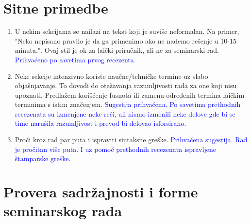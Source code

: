 \documentclass[a4paper]{report}
\newcommand{\odgovor}[1]{\textcolor{blue}{#1}}
\begin{document}
\section{Sitne primedbe}
\begin{enumerate}
\item U nekim sekcijama se nailazi na tekst koji je suviše neformalan. Na primer, "Neko nepisano pravilo je da ga primenimo ako ne nademo rešenje u 10-15 minuta.". Ovaj stil je ok za laički priručnik, ali ne za seminarski rad.
\odgovor{Prihvaćeno po savetima prvog recezenta.}
\item Neke sekcije intenzivno koriste naučne/tehničke termine uz slabo objašnjavanje. To dovodi do otežavanja razumljivosti rada za one koji nisu upoznati. Predlažem korišćenje fusnota ili zamenu određenih termina laičkim terminima s istim značenjem.
\odgovor{Sugestija prihvaćena. Po savetima prethodnih recezenata su izmenjene neke reči, ali nismo izmenili neke delove gde bi se time narušila razumljivost i prevod bi delovao isforsirano.}
\item Proći kroz rad par puta i ispraviti sintaksne greške.
\odgovor{Prihvaćena sugestija. Rad je pročitan više puta. I uz pomoć prethodnih recezenata ispravljene štamparske greške.}
\end{enumerate}

\section{Provera sadržajnosti i forme seminarskog rada}
\end{document}
